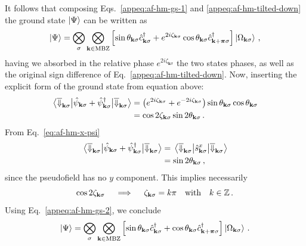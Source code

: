 It follows that composing Eqs.~\eqref{appeq:af-hm-gs-1} and \eqref{appeq:af-hm-tilted-down} the ground state $\ket{\Psi}$ can be written as
\begin{equation}\label{appeq:af-hm-gs-2}
	\ket{\Psi} = \bigotimes_\sigma \bigotimes_{\mathbf{k}\in\mathrm{MBZ}} \left[
	\sin\theta_{\mathbf{k}\sigma} \hat c_{\mathbf{k}\sigma}^\dagger + e^{2i\zeta_{\mathbf{k}\sigma}} \cos \theta_{\mathbf{k}\sigma} \hat c_{\mathbf{k}+\bm{\pi}\sigma}^\dagger
	\right] \ket{\Omega_{\mathbf{k}\sigma}} \, ,
\end{equation}
having we absorbed in the relative phase $e^{2i\zeta_{\mathbf{k}\sigma}}$ the two states phases, as well as the original sign difference of Eq.~\eqref{appeq:af-hm-tilted-down}. Now, inserting the explicit form of the ground state from equation above:
\[
\begin{aligned}
	\mel{\overline{\Downarrow}_{\mathbf{k}\sigma}}{\hat \psi_{\mathbf{k}\sigma} + \hat \psi_{\mathbf{k}\sigma}^\dagger}{\overline{\Downarrow}_{\mathbf{k}\sigma}} &= \left(e^{2i\zeta_{\mathbf{k}\sigma}} + e^{-2i\zeta_{\mathbf{k}\sigma}}\right) \sin\theta_{\mathbf{k}\sigma} \cos\theta_{\mathbf{k}\sigma} \\
	&= \cos 2\zeta_{\mathbf{k}\sigma} \sin 2\theta_{\mathbf{k}\sigma} \, .
\end{aligned}
\]
From Eq.~\eqref{eq:af-hm-x-psi}
\[
\begin{aligned}
	\mel{\overline{\Downarrow}_{\mathbf{k}\sigma}}{\hat \psi_{\mathbf{k}\sigma} + \hat \psi_{\mathbf{k}\sigma}^\dagger}{\overline{\Downarrow}_{\mathbf{k}\sigma}} &= 	\mel{\overline{\Downarrow}_{\mathbf{k}\sigma}}{\hat s_{\mathbf{k}\sigma}^x}{\overline{\Downarrow}_{\mathbf{k}\sigma}} \\
	&= \sin 2\theta_{\mathbf{k}\sigma} \, ,
\end{aligned}
\]
since the pseudofield has no $y$ component. This implies necessarily
\[
	\cos 2\zeta_{\mathbf{k}\sigma}
	\quad\implies\quad
	\zeta_{\mathbf{k}\sigma} = k\pi
	\qq{with}
	k\in\mathbb{Z} \, .
\]
Using Eq.~\eqref{appeq:af-hm-gs-2}, we conclude
\begin{equation}\label{appeq:af-hm-gs-3}
	\ket{\Psi} = \bigotimes_\sigma \bigotimes_{\mathbf{k}\in\mathrm{MBZ}} \left[
	\sin \theta_{\mathbf{k}\sigma} \hat c_{\mathbf{k}\sigma}^\dagger + \cos \theta_{\mathbf{k}\sigma} \hat c_{\mathbf{k}+\bm{\pi}\sigma}^\dagger
	\right] \ket{\Omega_{\mathbf{k}\sigma}} \, .
\end{equation}


